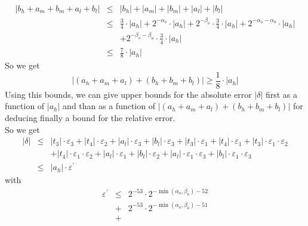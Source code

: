 \documentclass[a4paper,10pt,twoside]{article}
\newenvironment{proof}[1][Proof]{\begin{trivlist}
\item[\hskip \labelsep {\bfseries #1}]}{\end{trivlist}}
\newcommand{\hi}{\ensuremath{\mathit{h}}}
\newcommand{\mi}{\ensuremath{\mathit{m}}}
\newcommand{\lo}{\ensuremath{\mathit{l}}}
\renewcommand{\epsilon}{\varepsilon}
\begin{document}
\begin{proof}
\begin{eqnarray*}
\left \vert b_\hi + a_\mi + b_\mi + a_\lo + b_\lo \right \vert & \leq & 
\left \vert b_\hi \right \vert + \left \vert a_\mi \right \vert + \left \vert b_\mi \right \vert + \left \vert a_\lo \right \vert + 
\left \vert b_\lo \right \vert \\
& \leq & \frac{3}{4} \cdot \left \vert a_\hi \right \vert + 2^{-\alpha_o} \cdot \left \vert a_\hi \right \vert + 
2^{-\beta_o} \cdot \frac{3}{4} \cdot \left \vert a_\hi \right \vert + 2^{-\alpha_o-\alpha_u} \cdot \left \vert a_\hi \right \vert \\ & & 
+ 2^{-\beta_o-\beta_u} \cdot \frac{3}{4} \cdot \left \vert a_\hi \right \vert \\
& \leq & \frac{7}{8} \cdot \left \vert a_\hi \right \vert 
\end{eqnarray*}
So we get
$$\left \vert \left( a_\hi + a_\mi + a_\lo \right) + \left( b_\hi + b_\mi + b_\lo \right) \right \vert 
\geq \frac{1}{8} \cdot \left \vert a_\hi \right \vert$$
Using this bounds, we can give upper bounds for the absolute error $\left
  \vert \delta \right \vert$ first as a function of $\left \vert a_\hi \right
\vert$ and than as a function of 
$\left \vert \left( a_\hi + a_\mi + a_\lo \right) + \left( b_\hi + b_\mi +
    b_\lo \right) \right \vert$ for
deducing finally a bound for the relative error. \\
So we get
\begin{eqnarray*}
\left \vert \delta \right \vert & \leq & \left \vert t_3 \right \vert \cdot \epsilon_3 + \left \vert t_4 \right \vert \cdot \epsilon_2 +
\left \vert a_\lo \right \vert \cdot \epsilon_3 + \left \vert b_\lo \right \vert \cdot \epsilon_3 + \left \vert t_3 \right \vert \cdot \epsilon_1
+ \left \vert t_4 \right \vert \cdot \epsilon_1 + \left \vert t_3 \right \vert \cdot \epsilon_1 \cdot \epsilon_2 \\
& & + \left \vert t_4 \right \vert \cdot \epsilon_1 \cdot \epsilon_2 + \left \vert a_\lo \right \vert \cdot \epsilon_1 +
\left \vert b_\lo \right \vert \cdot \epsilon_2 + \left \vert a_\lo \right \vert \cdot \epsilon_1 \cdot \epsilon_3 +
\left \vert b_\lo \right \vert \cdot \epsilon_1 \cdot \epsilon_3 \\
& \leq & \left \vert a_\hi \right \vert \cdot \epsilon^\prime
\end{eqnarray*}
with
\begin{eqnarray*}
\epsilon^\prime & \leq & 
2^{-53} \cdot 2^{-\min\left(\alpha_o,\beta_o\right)-52} \\ & + &
2^{-53} \cdot 2^{-\min\left(\alpha_o,\beta_o\right)-51} \\ & + &

\end{eqnarray*}
\end{proof}
\end{document}
